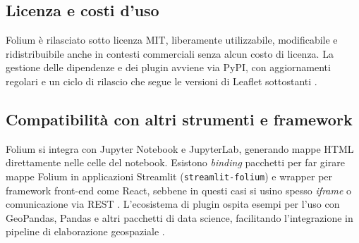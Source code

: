 \subsection{Licenza e costi d'uso}
Folium è rilasciato sotto licenza MIT, liberamente utilizzabile, modificabile e ridistribuibile
anche in contesti commerciali senza alcun costo di licenza. La gestione delle
dipendenze e dei plugin avviene via PyPI, con aggiornamenti regolari e un ciclo di
rilascio che segue le versioni di Leaflet sottostanti \cite{folium-lic,folium-pypi}.

\subsection{Compatibilità con altri strumenti e framework}
Folium si integra con Jupyter Notebook e JupyterLab, generando mappe HTML 
direttamente nelle celle del notebook. Esistono \textit{binding} pacchetti per far
girare mappe Folium in applicazioni Streamlit (\texttt{streamlit-folium}) e
wrapper per framework front-end come React, sebbene in questi casi si usino spesso
\textit{iframe} o comunicazione via REST \cite{folium-github,folium-react}. L'ecosistema
di plugin ospita esempi per l'uso con GeoPandas, Pandas e altri pacchetti di
data science, facilitando l'integrazione in pipeline di elaborazione geospaziale
\cite{folium-doc,folium-userguide}.

\newpage